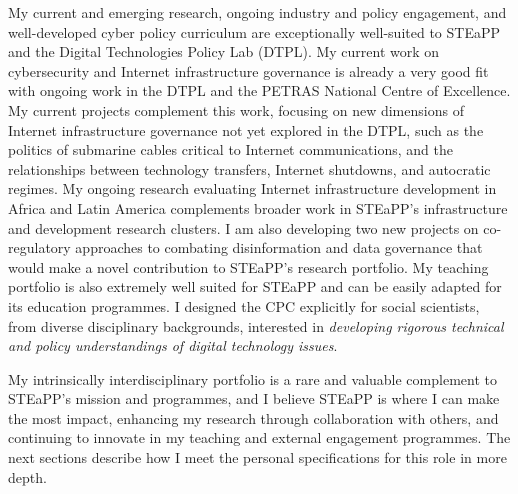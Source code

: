 \documentclass[11pt]{letter}
\begin{document}
\begin{letter}
My current and emerging research, ongoing industry and policy engagement, and well-developed cyber policy curriculum are exceptionally well-suited to STEaPP and the Digital Technologies Policy Lab (DTPL).
%
My current work on cybersecurity and Internet infrastructure governance is already a very good fit with ongoing work in the DTPL and the PETRAS National Centre of Excellence. 
%
My current projects complement this work, focusing on new dimensions of Internet infrastructure governance not yet explored in the DTPL, such as the politics of submarine cables critical to Internet communications, and the relationships between technology transfers, Internet shutdowns, and autocratic regimes. 
%
My ongoing research evaluating Internet infrastructure development in Africa and Latin America complements broader work in STEaPP’s infrastructure and development research clusters.
%
I am also developing two new projects on co-regulatory approaches to combating disinformation and data governance that would make a novel contribution to STEaPP’s research portfolio. 
%
My teaching portfolio is also extremely well suited for STEaPP and can be easily adapted for its education programmes.
%
%
I designed the CPC explicitly for social scientists, from diverse disciplinary backgrounds, interested in \emph{developing rigorous technical and policy understandings of digital technology issues}.
%
%
%

My intrinsically interdisciplinary portfolio is a rare and valuable complement to STEaPP's mission and programmes, and I believe STEaPP is where I can make the most impact, enhancing my research through collaboration with others, and continuing to innovate in my teaching and external engagement programmes.
%
The next sections describe how I meet the personal specifications for this role in more depth. 





\end{letter}
\end{document}
